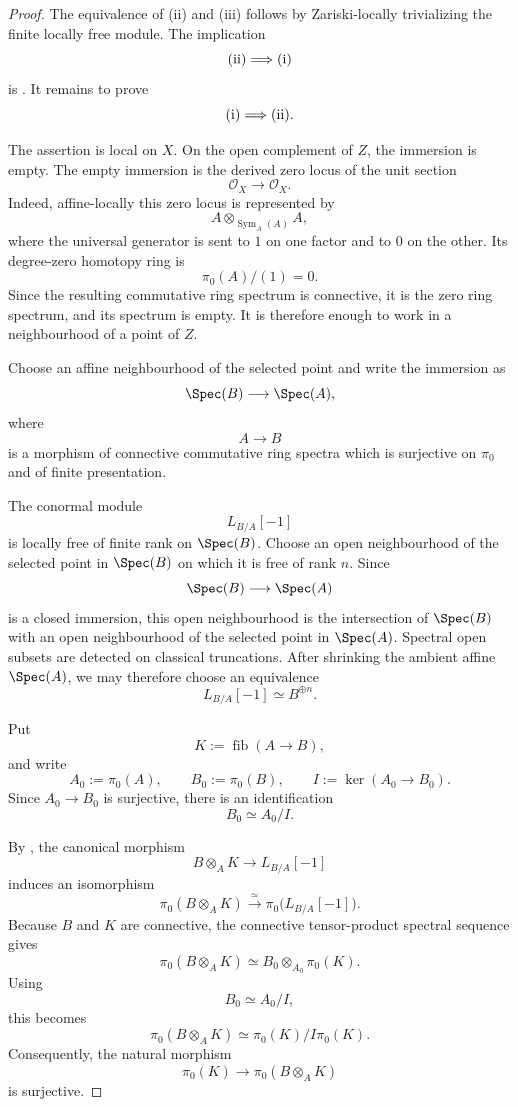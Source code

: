 \begin{proof}
The equivalence of \textup{(ii)} and \textup{(iii)} follows by
Zariski-locally trivializing the finite locally free module. The
implication
\[
    \textup{(ii)}
    \Longrightarrow
    \textup{(i)}
\]
is . It remains to prove
\[
    \textup{(i)}
    \Longrightarrow
    \textup{(ii)}.
\]

The assertion is local on \(X\). On the open complement of \(Z\), the
immersion is empty. The empty immersion is the derived zero locus of the
unit section
\[
    \mathcal O_X
    \longrightarrow
    \mathcal O_X.
\]
Indeed, affine-locally this zero locus is represented by
\[
    A
    \otimes_{\operatorname{Sym}_A(A)}
    A,
\]
where the universal generator is sent to \(1\) on one factor and to
\(0\) on the other. Its degree-zero homotopy ring is
\[
    \pi_0(A)/(1)
    =
    0.
\]
Since the resulting commutative ring spectrum is connective, it is the
zero ring spectrum, and its spectrum is empty.
It is therefore enough to work in a neighbourhood of a point of \(Z\).

Choose an affine neighbourhood of the selected point and write the
immersion as
\[
    \Spec(B)
    \longrightarrow
    \Spec(A),
\]
where
\[
    A
    \longrightarrow
    B
\]
is a morphism of connective commutative ring spectra which is surjective
on \(\pi_0\) and of finite presentation.

The conormal module
\[
    L_{B/A}[-1]
\]
is locally free of finite rank on \(\Spec(B)\). Choose an open
neighbourhood of the selected point in \(\Spec(B)\) on which it is free
of rank \(n\). Since
\[
    \Spec(B)
    \longrightarrow
    \Spec(A)
\]
is a closed immersion, this open neighbourhood is the intersection of
\(\Spec(B)\) with an open neighbourhood of the selected point in
\(\Spec(A)\). Spectral open subsets are detected on classical
truncations. After shrinking the ambient affine \(\Spec(A)\), we may
therefore choose an equivalence
\[
    L_{B/A}[-1]
    \simeq
    B^{\oplus n}.
\]

Put
\[
    K
    :=
    \operatorname{fib}(A\to B),
\]
and write
\[
    A_0
    :=
    \pi_0(A),
    \qquad
    B_0
    :=
    \pi_0(B),
    \qquad
    I
    :=
    \ker(A_0\to B_0).
\]
Since \(A_0\to B_0\) is surjective, there is an identification
\[
    B_0
    \simeq
    A_0/I.
\]

By , the canonical morphism
\[
    B\otimes_AK
    \longrightarrow
    L_{B/A}[-1]
\]
induces an isomorphism
\[
    \pi_0(B\otimes_AK)
    \xrightarrow{\simeq}
    \pi_0
    \bigl(
        L_{B/A}[-1]
    \bigr).
\]
Because \(B\) and \(K\) are connective, the connective tensor-product
spectral sequence gives
\[
    \pi_0(B\otimes_AK)
    \simeq
    B_0\otimes_{A_0}\pi_0(K).
\]
Using
\[
    B_0
    \simeq
    A_0/I,
\]
this becomes
\[
    \pi_0(B\otimes_AK)
    \simeq
    \pi_0(K)/I\pi_0(K).
\]
Consequently, the natural morphism
\[
    \pi_0(K)
    \longrightarrow
    \pi_0(B\otimes_AK)
\]
is surjective.


\end{proof}
